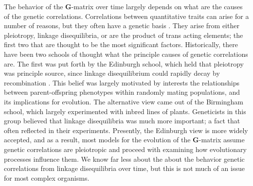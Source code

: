 \documentclass[11pt,twocolumn]{article}
\begin{document}
The behavior of the \textbf{G}-matrix over time largely depends on what are the causes of the genetic correlations. Correlations between quantitative traits can arise for a number of reasons, but they often have a genetic basis \citep{Saltz2017}. They arise from either pleiotropy, linkage disequilibria, or are the product of trans acting elements; the first two that are thought to be the most significant factors. Historically, there have been two schools of thought what the principle causes of genetic correlations are. The first was put forth by the Edinburgh school, which held that pleiotropy was principle source, since linkage disequilibrium could rapidly decay by recombination \citep[Chapter~20]{fox2006evolutionary}. This belief was largely motivated by interests the relationships between parent-offspring phenotypes within randomly mating populations, and its implications for evolution. The alternative view came out of the Birmingham school, which largely experimented with inbred lines of plants. Geneticists in this group believed that linkage disequilibria was much more important; a fact that often reflected in their experiments. Presently, the Edinburgh view is more widely accepted, and as a result, most models for the evolution of the \textbf{G}-matrix assume genetic correlations are pleiotropic and proceed with examining how evolutionary processes influence them. We know far less about the about the behavior genetic correlations from linkage disequilibria over time, but this is not much of an issue for most complex organisms.\par
% 
% 
% 
% 
\end{document}
